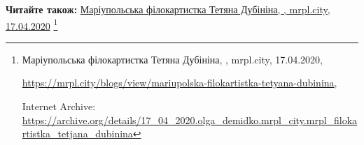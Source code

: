  
 
 
 
 

\def\pubIA{https://archive.org/details/17_04_2020.olga_demidko.mrpl_city.mrpl_filokartistka_tetjana_dubinina}
\def\pubTitle{Маріупольська філокартистка Тетяна Дубініна}
\def\pubDate{17.04.2020}
\def\pubOrigin{https://mrpl.city/blogs/view/mariupolska-filokartistka-tetyana-dubinina}
\def\pubAuthor{\pubAuthorDemidko}

\textbf{Читайте також:} \href{\pubIA}{%
\pubTitle, \pubAuthor, mrpl.city, \pubDate}%
\footnote{\pubTitle, \pubAuthor, mrpl.city, \pubDate, \par\url{\pubOrigin}, \par Internet Archive: \url{\pubIA}}
